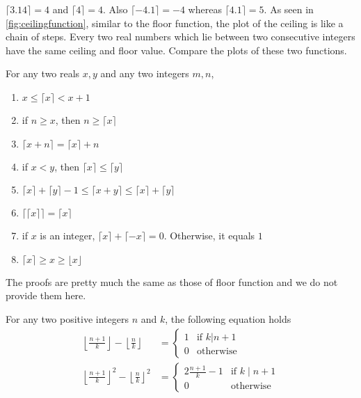 \documentclass{subfile}
\begin{document}
\begin{example}
	$\lceil3.14\rceil=4$ and $\lceil4\rceil=4$. Also $\lceil-4.1\rceil=-4$ whereas $\lceil4.1\rceil=5$. As seen in \autoref{fig:ceilingfunction}, similar to the floor function, the plot of the ceiling is like a chain of steps. Every two real numbers which lie between two consecutive integers have the same ceiling and floor value. Compare the plots of these two functions.
\end{example}

\begin{proposition} \label{prop:ceiling}
	For any two reals $x, y$ and any two integers $m,n$,
	\begin{enumerate}[1.]
		\item $x\leq \lceil x\rceil < x+1$
		\item if $n \geq x$, then $n \geq \lceil x \rceil$
		\item $\lceil x+n\rceil=\lceil x\rceil+n$
		\item if $x <y$, then $\lceil x \rceil \leq \lceil y \rceil$
		\item $\lceil x\rceil+\lceil y \rceil - 1 \leq \lceil x+y\rceil \leq \lceil x\rceil+\lceil y\rceil$
		\item $\lceil \lceil x\rceil\rceil  =  \lceil x\rceil$
		\item if $x$ is an integer, $\lceil x\rceil+\lceil -x\rceil=0$. Otherwise, it equals $1$
		\item $\lceil x \rceil \geq x \geq \lfloor x \rfloor$
	\end{enumerate}
\end{proposition}

The proofs are pretty much the same as those of floor function and we do not provide them here.

\begin{theorem}\label{thm:floor-k|n+1}
	For any two positive integers $n$ and $k$, the following equation holds
	\begin{align*}
		\left\lfloor \frac{n+1}{k} \right\rfloor - \left\lfloor \frac{n}{k} \right\rfloor &=
		\begin{cases}
			1&\mbox{if }k|n+1\\
			0&\mbox{otherwise}
		\end{cases}\\
		\left\lfloor \frac{n+1}{k} \right\rfloor^2 - \left\lfloor \frac{n}{k} \right\rfloor^2 &=
		\begin{cases}
			2\frac{n+1}{k}-1&\mbox{if }k\mid n+1\\
			0&\mbox{otherwise}
		\end{cases}
	\end{align*}
\end{theorem}
\end{document}
